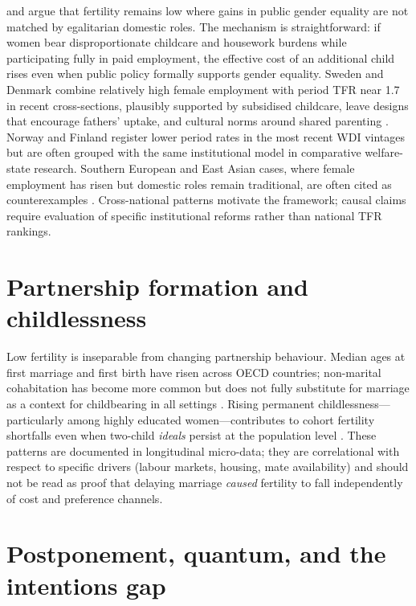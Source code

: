 \documentclass[11pt,a4paper,openany]{book}
\begin{document}
\citet{mcdonald2000} and \citet{goldscheider2015} argue that fertility remains low where gains in public gender equality are not matched by egalitarian domestic roles. The mechanism is straightforward: if women bear disproportionate childcare and housework burdens while participating fully in paid employment, the effective cost of an additional child rises even when public policy formally supports gender equality. Sweden and Denmark combine relatively high female employment with period TFR near 1.7 in recent cross-sections, plausibly supported by subsidised childcare, leave designs that encourage fathers' uptake, and cultural norms around shared parenting \citep{castles2003,luci2013,raute2019}. Norway and Finland register lower period rates in the most recent WDI vintages but are often grouped with the same institutional model in comparative welfare-state research. Southern European and East Asian cases, where female employment has risen but domestic roles remain traditional, are often cited as counterexamples \citep{goldscheider2015,jones2019}. Cross-national patterns motivate the framework; causal claims require evaluation of specific institutional reforms rather than national TFR rankings.

\section{Partnership formation and childlessness}

Low fertility is inseparable from changing partnership behaviour. Median ages at first marriage and first birth have risen across OECD countries; non-marital cohabitation has become more common but does not fully substitute for marriage as a context for childbearing in all settings \citep{perelliharris2012,perelliharris2012pd}. Rising permanent childlessness---particularly among highly educated women---contributes to cohort fertility shortfalls even when two-child \emph{ideals} persist at the population level \citep{sobotka2017}. These patterns are documented in longitudinal micro-data; they are correlational with respect to specific drivers (labour markets, housing, mate availability) and should not be read as proof that delaying marriage \emph{caused} fertility to fall independently of cost and preference channels.

\section{Postponement, quantum, and the intentions gap}
\end{document}
